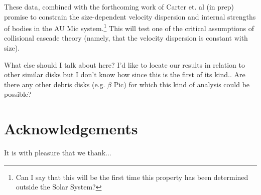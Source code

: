 \documentclass[12pt,oneside]{article}
\begin{document}
These data, combined with the forthcoming work of Carter et. al (in prep) promise to constrain the size-dependent velocity dispersion and internal strengths of bodies in the AU Mic system.\footnote{Can I say that this will be the first time this property has been determined outside the Solar System?} 
This will test one of the critical assumptions of collisional cascade theory (namely, that the velocity dispersion is constant with size).

What else should I talk about here? I'd like to locate our results in relation to other similar disks but I don't know how since this is the first of its kind.. Are there any other debris disks (e.g. $\beta$ Pic) for which this kind of analysis could be possible?

\section*{Acknowledgements}
It is with pleasure that we thank...
\clearpage

\end{document}

